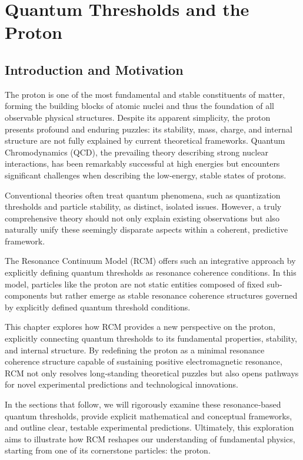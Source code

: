 \chapter{Quantum Thresholds and the Proton}


\section{Introduction and Motivation}

The proton is one of the most fundamental and stable constituents of matter, forming the building blocks of atomic nuclei and thus the foundation of all observable physical structures. Despite its apparent simplicity, the proton presents profound and enduring puzzles: its stability, mass, charge, and internal structure are not fully explained by current theoretical frameworks. Quantum Chromodynamics (QCD), the prevailing theory describing strong nuclear interactions, has been remarkably successful at high energies but encounters significant challenges when describing the low‐energy, stable states of protons.

Conventional theories often treat quantum phenomena, such as quantization thresholds and particle stability, as distinct, isolated issues. However, a truly comprehensive theory should not only explain existing observations but also naturally unify these seemingly disparate aspects within a coherent, predictive framework.

The Resonance Continuum Model (RCM) offers such an integrative approach by explicitly defining quantum thresholds as resonance coherence conditions. In this model, particles like the proton are not static entities composed of fixed sub‐components but rather emerge as stable resonance coherence structures governed by explicitly defined quantum threshold conditions.

This chapter explores how RCM provides a new perspective on the proton, explicitly connecting quantum thresholds to its fundamental properties, stability, and internal structure. By redefining the proton as a minimal resonance coherence structure capable of sustaining positive electromagnetic resonance, RCM not only resolves long‐standing theoretical puzzles but also opens pathways for novel experimental predictions and technological innovations.

In the sections that follow, we will rigorously examine these resonance‐based quantum thresholds, provide explicit mathematical and conceptual frameworks, and outline clear, testable experimental predictions. Ultimately, this exploration aims to illustrate how RCM reshapes our understanding of fundamental physics, starting from one of its cornerstone particles: the proton.

